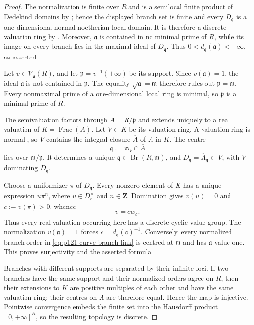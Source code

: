 \begin{proof}
The normalization is finite over \(R\) and is a semilocal finite product of
Dedekind domains by \cite[Tag~0C1R]{StacksProject}; hence the displayed
branch set is finite and every \(D_{\mathfrak q}\) is a one-dimensional
normal noetherian local domain.  It is therefore a discrete valuation ring
by \cite[Tag~00PD]{StacksProject}.
Moreover, \(\mathfrak a\) is contained in no minimal prime of \(R\), while
its image on every branch lies in the maximal ideal of
\(D_{\mathfrak q}\).  Thus
\(0<d_{\mathfrak q}(\mathfrak a)<+\infty\), as asserted.

Let \(v\in\mathcal V_{\mathfrak a}(R)\), and let
\(\mathfrak p=v^{-1}(+\infty)\) be its support.  Since
\(v(\mathfrak a)=1\), the ideal \(\mathfrak a\) is not contained in
\(\mathfrak p\).  The equality
\(\sqrt{\mathfrak a}=\mathfrak m\) therefore rules out
\(\mathfrak p=\mathfrak m\).  Every nonmaximal prime of a
one-dimensional local ring is minimal, so \(\mathfrak p\) is a minimal
prime of \(R\).

The semivaluation factors through \(A=R/\mathfrak p\) and extends uniquely
to a real valuation of \(K=\operatorname{Frac}(A)\).  Let \(V\subset K\)
be its valuation ring.  A valuation ring is normal
\cite[Tag~00IC]{StacksProject}, so \(V\) contains the integral closure
\(\overline A\) of \(A\) in \(K\).  The centre
\[
                 \overline{\mathfrak q}
                  :=\mathfrak m_V\cap\overline A
\]
lies over \(\mathfrak m/\mathfrak p\).  It determines a unique
\(\mathfrak q\in\operatorname{Br}(R,\mathfrak m)\), and
\(D_{\mathfrak q}=\overline A_{\overline{\mathfrak q}}\subset V\), with
\(V\) dominating \(D_{\mathfrak q}\).

Choose a uniformizer \(\pi\) of \(D_{\mathfrak q}\).  Every nonzero
element of \(K\) has a unique expression \(u\pi^n\), where
\(u\in D_{\mathfrak q}^{\times}\) and \(n\in\mathbf Z\).  Domination gives
\(v(u)=0\) and \(c:=v(\pi)>0\), whence
\[
                              v=cw_{\mathfrak q}.
\]
Thus every real valuation occurring here has a discrete cyclic value group.
The normalization \(v(\mathfrak a)=1\) forces
\(c=d_{\mathfrak q}(\mathfrak a)^{-1}\).  Conversely, every normalized
branch order in \eqref{eq:p121-curve-branch-link} is centred at
\(\mathfrak m\) and has \(\mathfrak a\)-value one.  This proves
surjectivity and the asserted formula.

Branches with different supports are separated by their infinite loci.  If
two branches have the same support and their normalized orders agree on
\(R\), then their extensions to \(K\) are positive multiples of each other
and have the same valuation ring; their centres on \(\overline A\) are
therefore equal.  Hence the map is injective.  Pointwise convergence embeds
the finite set into the Hausdorff product
\([0,+\infty]^R\), so the resulting topology is discrete.


\end{proof}
